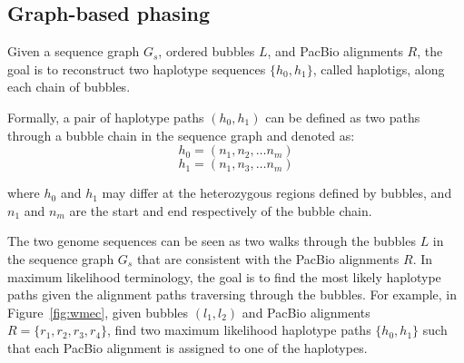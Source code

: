 \subsection{Graph-based phasing}
\label{sec:phasing} 
Given a sequence graph $G_s$, ordered bubbles $L$, and PacBio alignments $R$, the goal is to reconstruct two haplotype sequences $\{h_0, h_1\}$, called haplotigs, along each chain of bubbles.
\begin{definition}
Formally, a pair of haplotype paths $(h_0, h_1)$ can be defined as two paths through a bubble chain in the sequence graph and denoted as: 
\[h_0=(n_1, n_2, \ldots n_m )\]  
\[h_1=(n_1, n_3, \ldots n_m )\]

where $h_0$ and $h_1$ may differ at the heterozygous regions defined by bubbles, and $n_1$ and $n_m$ are the start and end respectively of the bubble chain.
\end{definition}

The two genome sequences can be seen as two walks through the bubbles $L$ in the sequence graph $G_s$ that are consistent with the PacBio alignments $R$.
In maximum likelihood terminology, the goal is to find the most likely haplotype paths given the alignment paths traversing through the bubbles.
For example, in Figure~\ref{fig:wmec}, given bubbles $(l_1, l_2)$ and PacBio alignments $R=\{r_1,r_2,r_3,r_4\}$, find two maximum likelihood haplotype paths $\{h_0, h_1\}$ such that each PacBio alignment is assigned to one of the haplotypes. 

